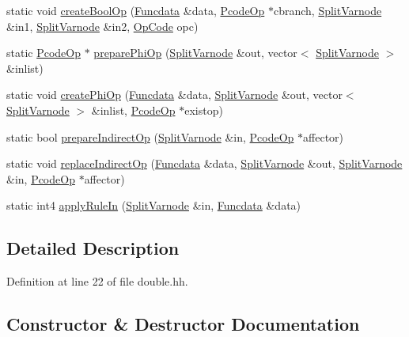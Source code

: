 \begin{DoxyCompactItemize}
static void \mbox{\hyperlink{class_split_varnode_a7cc1768236a8f0edf17b3b8e31bb2eb4}{create\+Bool\+Op}} (\mbox{\hyperlink{class_funcdata}{Funcdata}} \&data, \mbox{\hyperlink{class_pcode_op}{Pcode\+Op}} $\ast$cbranch, \mbox{\hyperlink{class_split_varnode}{Split\+Varnode}} \&in1, \mbox{\hyperlink{class_split_varnode}{Split\+Varnode}} \&in2, \mbox{\hyperlink{opcodes_8hh_abeb7dfb0e9e2b3114e240a405d046ea7}{Op\+Code}} opc)
\item 
static \mbox{\hyperlink{class_pcode_op}{Pcode\+Op}} $\ast$ \mbox{\hyperlink{class_split_varnode_a1a67136592624e6bd5612cea36e891dd}{prepare\+Phi\+Op}} (\mbox{\hyperlink{class_split_varnode}{Split\+Varnode}} \&out, vector$<$ \mbox{\hyperlink{class_split_varnode}{Split\+Varnode}} $>$ \&inlist)
\item 
static void \mbox{\hyperlink{class_split_varnode_afb3f6dcf9f8412ffb6120f652991cce6}{create\+Phi\+Op}} (\mbox{\hyperlink{class_funcdata}{Funcdata}} \&data, \mbox{\hyperlink{class_split_varnode}{Split\+Varnode}} \&out, vector$<$ \mbox{\hyperlink{class_split_varnode}{Split\+Varnode}} $>$ \&inlist, \mbox{\hyperlink{class_pcode_op}{Pcode\+Op}} $\ast$existop)
\item 
static bool \mbox{\hyperlink{class_split_varnode_a11bfb0c446ec6ea8d2fdd25c9481a801}{prepare\+Indirect\+Op}} (\mbox{\hyperlink{class_split_varnode}{Split\+Varnode}} \&in, \mbox{\hyperlink{class_pcode_op}{Pcode\+Op}} $\ast$affector)
\item 
static void \mbox{\hyperlink{class_split_varnode_abe58b89c66472db3c107fd338348e918}{replace\+Indirect\+Op}} (\mbox{\hyperlink{class_funcdata}{Funcdata}} \&data, \mbox{\hyperlink{class_split_varnode}{Split\+Varnode}} \&out, \mbox{\hyperlink{class_split_varnode}{Split\+Varnode}} \&in, \mbox{\hyperlink{class_pcode_op}{Pcode\+Op}} $\ast$affector)
\item 
static int4 \mbox{\hyperlink{class_split_varnode_a07d18e3a13c7be35cd42f1762214d3f8}{apply\+Rule\+In}} (\mbox{\hyperlink{class_split_varnode}{Split\+Varnode}} \&in, \mbox{\hyperlink{class_funcdata}{Funcdata}} \&data)
\end{DoxyCompactItemize}


\subsection{Detailed Description}


Definition at line 22 of file double.\+hh.



\subsection{Constructor \& Destructor Documentation}
\mbox{\label{class_split_varnode_ae29b33d88c26f56baafd37cf1bad356c}} 
